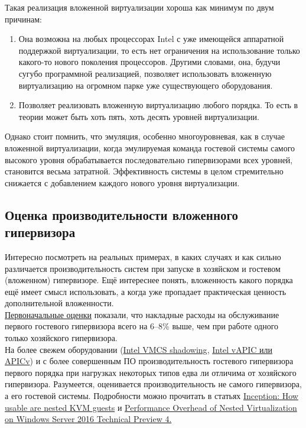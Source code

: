 \documentclass[14pt, a4paper]{article}
\begin{document}
Такая реализация вложенной виртуализации хороша как минимум по двум причинам:
\begin{enumerate}
    \item Она возможна на любых процессорах Intel с уже имеющейся аппаратной поддержкой
    виртуализации, то есть нет ограничения на использование только какого-то нового поколения
    процессоров. Другими словами, она, будучи сугубо программной реализацией, позволяет
    использовать вложенную виртуализацию на огромном парке уже существующего
    оборудования.
    \item Позволяет реализовать вложенную виртуализацию любого порядка. То есть в теории может
    быть хоть пять, хоть десять уровней виртуализации.
\end{enumerate}

Однако стоит помнить, что эмуляция, особенно многоуровневая, как в случае вложенной
виртуализации, когда эмулируемая команда гостевой системы самого высокого уровня
обрабатывается последовательно гипервизорами всех уровней, становится весьма затратной.
Эффективность системы в целом стремительно снижается с добавлением каждого нового уровня
виртуализации.

\subsection*{Оценка производительности вложенного гипервизора}

Интересно посмотреть на реальных примерах, в каких случаях и как сильно различается
производительность систем при запуске в хозяйском и гостевом (вложенном) гипервизоре. Ещё
интереснее понять, вложенность какого порядка ещё имеет смысл использовать, а когда уже
пропадает практическая ценность дополнительной вложенности.\\

\href{https://www.usenix.org/}{Первоначальные оценки} показали, что накладные расходы на обслуживание первого гостевого
гипервизора всего на 6–8\% выше, чем при работе одного только хозяйского гипервизора.\\

На более свежем оборудовании (\href{https://www.intel.com/content/www/us/en/support/ru-banner-inside.html}{Intel VMCS shadowing}, 
\href{https://www.intel.com/content/www/us/en/support/ru-banner-inside.html}{Intel vAPIC или APICv}) и с более
совершенным ПО производительность гостевого гипервизора первого порядка при нагрузках
некоторых типов едва ли отличима от хозяйского гипервизора. Разумеется, оценивается
производительность не самого гипервизора, а его гостевой системы. Подробности можно прочитать в
статьях \href{https://www.redhat.com/en/blog/inception-how-usable-are-nested-kvm-guests}{Inception: How usable are nested KVM guests} 
и \href{https://blogs.technet.microsoft.com/larryexchange/2015/12/29/performance-overhead-of-nested-virtualization-on-windows-server-2016-technical-preview-4/}{Performance Overhead of Nested Virtualization on Windows Server 2016 Technical Preview 4.}
\end{document}
